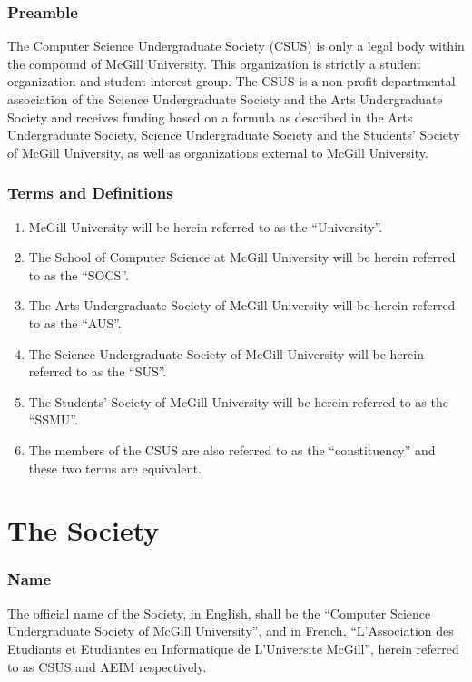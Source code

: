 \section*{Preamble}\label{preamble}

The Computer Science Undergraduate Society (CSUS) is only a legal body within the compound of McGill University. This organization is strictly a student organization and student interest group. The CSUS is a non-profit departmental association of the Science Undergraduate Society and the Arts Undergraduate Society and receives funding based on a formula as described in the Arts Undergraduate Society, Science Undergraduate Society and the Students' Society of McGill University, as well as organizations external to McGill University.

\section*{Terms and Definitions}\label{terms-and-definitions}

\begin{enumerate}
\def\labelenumi{\arabic{enumi}.}
\tightlist
\item
  McGill University will be herein referred to as the ``University''.
\item
  The School of Computer Science at McGill University will be herein
  referred to as the ``SOCS''.
\item
  The Arts Undergraduate Society of McGill University will be herein
  referred to as the ``AUS''.
\item
  The Science Undergraduate Society of McGill University will be herein
  referred to as the ``SUS''.
\item
  The Students' Society of McGill University will be herein referred to
  as the ``SSMU''.
\item
  The members of the CSUS are also referred to as the ``constituency''
  and these two terms are equivalent.
\end{enumerate}

\part{The Society}\label{the-society}

\section{Name}\label{name}

The official name of the Society, in EngIish, shall be the ``Computer
Science Undergraduate Society of McGill University'', and in French,
``L'Association des Etudiants et Etudiantes en Informatique de
L'Universite McGill'', herein referred to as CSUS and AEIM respectively.

